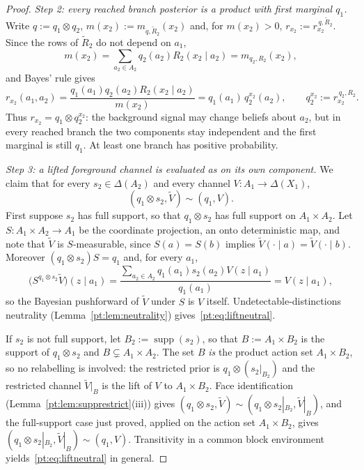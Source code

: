 \documentclass[11pt,a4paper]{article}
\theoremstyle{definition}
\newcommand{\1}{\mathbf 1}
\begin{document}
\begin{proof}
\emph{Step 2: every reached branch posterior is a product with first marginal $q_1$.}
Write $q:=q_1\otimes q_2$, $m(x_2):=m_{q,\widetilde R_2}(x_2)$ and, for $m(x_2)>0$, $r_{x_2}:=r_{x_2}^{\,q,\widetilde R_2}$.
Since the rows of $\widetilde R_2$ do not depend on $a_1$,
\[
m(x_2)=\sum_{a_2\in A_2}q_2(a_2)R_2(x_2\mid a_2)=m_{q_2,R_2}(x_2),
\]
and Bayes' rule gives
\[
r_{x_2}(a_1,a_2)
=\frac{q_1(a_1)q_2(a_2)R_2(x_2\mid a_2)}{m(x_2)}
=q_1(a_1)\,q_2^{x_2}(a_2),
\qquad
q_2^{x_2}:=r_{x_2}^{\,q_2,R_2}.
\]
Thus $r_{x_2}=q_1\otimes q_2^{x_2}$: the background signal may change beliefs about $a_2$, but in every reached branch
the two components stay independent and the first marginal is still $q_1$.  At least one branch has positive
probability.

\emph{Step 3: a lifted foreground channel is evaluated as on its own component.}
We claim that for every $s_2\in\Delta(A_2)$ and every channel $V:A_1\to\Delta(X_1)$,
\begin{equation}
(q_1\otimes s_2,\widetilde V)\sim(q_1,V).
\tag{$\dagger$}\label{pt:eq:liftneutral}
\end{equation}
First suppose $s_2$ has full support, so that $q_1\otimes s_2$ has full support on $A_1\times A_2$.  Let
$S:A_1\times A_2\to A_1$ be the coordinate projection, an onto deterministic map, and note that $\widetilde V$ is
$S$-measurable, since $S(a)=S(b)$ implies $\widetilde V(\cdot\mid a)=\widetilde V(\cdot\mid b)$.  Moreover
$(q_1\otimes s_2)S=q_1$ and, for every $a_1$,
\[
\bigl(S^{q_1\otimes s_2}\widetilde V\bigr)(z\mid a_1)
=\frac{\sum_{a_2\in A_2}q_1(a_1)s_2(a_2)V(z\mid a_1)}{q_1(a_1)}
=V(z\mid a_1),
\]
so the Bayesian pushforward of $\widetilde V$ under $S$ is $V$ itself.  Undetectable-distinctions neutrality
(Lemma~\ref{pt:lem:neutrality}) gives~\eqref{pt:eq:liftneutral}.

If $s_2$ is not full support, let $B_2:=\operatorname{supp}(s_2)$, so that $B:=A_1\times B_2$ is the support of
$q_1\otimes s_2$ and $B\subsetneq A_1\times A_2$.  The set $B$ \emph{is} the product action set $A_1\times B_2$, so no
relabelling is involved: the restricted prior is
$q_1\otimes(s_2|_{B_2})$ and the restricted channel $\widetilde V|_B$ is the lift of $V$ to $A_1\times B_2$.  Face
identification (Lemma~\ref{pt:lem:supprestrict}(iii)) gives
$(q_1\otimes s_2,\widetilde V)\sim(q_1\otimes s_2|_{B_2},\widetilde V|_B)$, and the full-support case just proved,
applied on the action set $A_1\times B_2$, gives $(q_1\otimes s_2|_{B_2},\widetilde V|_B)\sim(q_1,V)$.  Transitivity in a
common block environment yields~\eqref{pt:eq:liftneutral} in general.


\end{proof}
\end{document}
